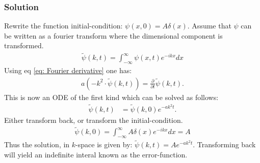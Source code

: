 \subsubsection*{Solution}
Rewrite the function initial-condition: $\psi(x,0) = A\delta(x)$. Assume that $\psi$ can be written as a fourier transform where the dimensional component is transformed.
\begin{align*}
    \tilde{\psi}(k, t) = \int_{-\infty}^\infty \psi(x,t)e^{-ik x}dx
\end{align*}Using eq \eqref{eq: Fourier derivative} one has:
\begin{align*}
    a \left(-k^2\cdot \tilde{\psi}(k, t)\right) = \frac{\partial}{\partial t}\tilde{\psi}(k, t).
\end{align*}This is now an ODE of the first kind which can be solved as follows:
\begin{align*}
    \tilde{\psi}(k, t) &= \tilde{\psi}(k, 0)e^{-a k^2 t}.
\end{align*}Either transform back, or transform the initial-condition.
\begin{align*}
    \tilde{\psi}(k,0)=\int_{-\infty}^{\infty}A\delta(x)e^{-ikx}dx = A
\end{align*}Thus the solution, in $k$-space is given by: $\tilde{\psi}(k, t) = Ae^{-ak^2t}.$ Transforming back will yield an indefinite interal known as the error-function.
